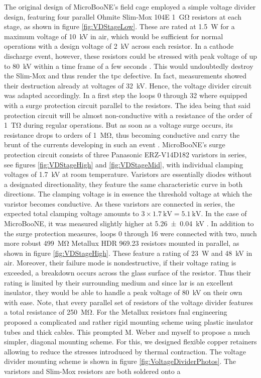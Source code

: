 The original design of MicroBooNE's field cage employed a simple voltage divider design, featuring four parallel Ohmite Slim-Mox 104E \SI{1}{\giga\ohm} resistors at each stage, as shown in figure \ref{fig:VDStageLow}. These are rated at \SI{1.5}{\watt} for a maximum voltage of \SI{10}{\kilo\volt} in air, which would be sufficient for normal operations with a design voltage of \SI{2}{\kilo\volt} across each resistor. In a cathode discharge event, however, these resistors could be stressed with peak voltage of up to \SI{80}{\kilo\volt} within a time frame of a few seconds \cite{MicroBooNEDetector}. This would undoubtedly destroy the Slim-Mox and thus render the \gls{tpc} defective. In fact, measurements showed their destruction already at voltages of \SI{32}{\kilo\volt}. Hence, the voltage divider circuit was adapted accordingly. In a first step the loops \num{0} through \num{32} where equipped with a surge protection circuit parallel to the resistors. The idea being that said protection circuit will be almost non-conductive with a resistance of the order of \SI{1}{\tera\ohm} during regular operations. But as soon as a voltage surge occurs, its resistance drops to orders of \SI{1}{\mega\ohm}, thus becoming conductive and carry the brunt of the currents developing in such an event \cite{SurgeProtection}. MicroBooNE's surge protection circuit consists of three Panasonic ERZ-V14D182 varistors in series, see figures \ref{fig:VDStageHigh} and \ref{fig:VDStageMid}, with individual clamping voltages of \SI{1.7}{\kilo\volt} at room temperature. Varistors are essentially diodes without a designated directionality, \ie they feature the same characteristic curve in both directions. The clamping voltage is in essence the threshold voltage at which the varistor becomes conductive. As these varistors are connected in series, the expected total clamping voltage amounts to $3\times\SI{1.7}{\kilo\volt} = \SI{5.1}{\kilo\volt}$. In the case of MicroBooNE, it was measured slightly higher at \SI{5.26(4)}{\kilo\volt} \cite{SurgeProtection}. In addition to the surge protection measures, loops \num{0} through \num{16} were connected with two, much more robust \SI{499}{\mega\ohm} Metallux HDR 969.23 resistors mounted in parallel, as shown in figure \ref{fig:VDStageHigh}. These feature a rating of \SI{23}{\watt} and \SI{48}{\kilo\volt} in air. Moreover, their failure mode is nondestructive, \ie if their voltage rating is exceeded, a breakdown occurs across the glass surface of the resistor. Thus their rating is limited by their surrounding medium and since \gls{lar} is an excellent insulator, they would be able to handle a peak voltage of \SI{80}{\kilo\volt} on their own with ease. Note, that every parallel set of resistors of the voltage divider features a total resistance of \SI{250}{\mega\ohm}. For the Metallux resistors \gls{fnal} engineering proposed a complicated and rather rigid mounting scheme using plastic insulator tubes and thick cables. This prompted M. Weber and myself to propose a much simpler, diagonal mounting scheme. For this, we designed flexible copper retainers allowing to reduce the stresses introduced by thermal contraction. The voltage divider mounting scheme is shown in figure \ref{fig:VoltageDividerPhotos}. The varistors and Slim-Mox resistors are both soldered onto a 